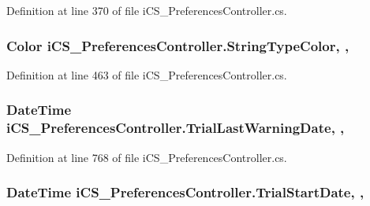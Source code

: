 Definition at line 370 of file i\+C\+S\+\_\+\+Preferences\+Controller.\+cs.

\hypertarget{classi_c_s___preferences_controller_ac9f21da90460198399fa072fef55eaff}{
\subsubsection[{String\+Type\+Color}]{\setlength{\rightskip}{0pt plus 5cm}Color i\+C\+S\+\_\+\+Preferences\+Controller.\+String\+Type\+Color\hspace{0.3cm}{\ttfamily [static]}, {\ttfamily [get]}, {\ttfamily [set]}}}\label{classi_c_s___preferences_controller_ac9f21da90460198399fa072fef55eaff}


Definition at line 463 of file i\+C\+S\+\_\+\+Preferences\+Controller.\+cs.

\hypertarget{classi_c_s___preferences_controller_a63a7e31de506cdfa0759eea34783d767}{
\subsubsection[{Trial\+Last\+Warning\+Date}]{\setlength{\rightskip}{0pt plus 5cm}Date\+Time i\+C\+S\+\_\+\+Preferences\+Controller.\+Trial\+Last\+Warning\+Date\hspace{0.3cm}{\ttfamily [static]}, {\ttfamily [get]}, {\ttfamily [set]}}}\label{classi_c_s___preferences_controller_a63a7e31de506cdfa0759eea34783d767}


Definition at line 768 of file i\+C\+S\+\_\+\+Preferences\+Controller.\+cs.

\hypertarget{classi_c_s___preferences_controller_aa741f8108f91bcc070babe315a75bd06}{
\subsubsection[{Trial\+Start\+Date}]{\setlength{\rightskip}{0pt plus 5cm}Date\+Time i\+C\+S\+\_\+\+Preferences\+Controller.\+Trial\+Start\+Date\hspace{0.3cm}{\ttfamily [static]}, {\ttfamily [get]}, {\ttfamily [set]}}}\label{classi_c_s___preferences_controller_aa741f8108f91bcc070babe315a75bd06}


